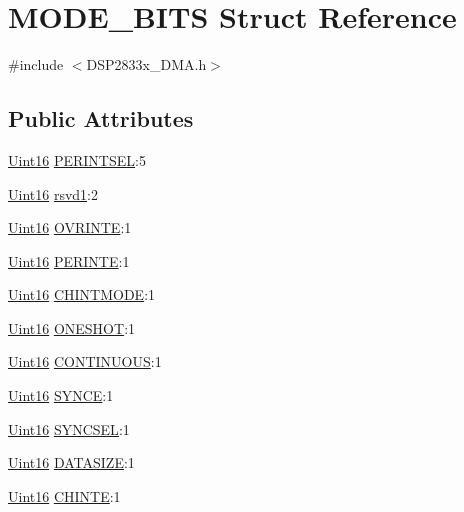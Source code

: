 \hypertarget{struct_m_o_d_e___b_i_t_s}{}\section{M\+O\+D\+E\+\_\+\+B\+I\+T\+S Struct Reference}
\label{struct_m_o_d_e___b_i_t_s}


{\ttfamily \#include $<$D\+S\+P2833x\+\_\+\+D\+M\+A.\+h$>$}

\subsection*{Public Attributes}
\begin{DoxyCompactItemize}
\item 
\hyperlink{_d_s_p2833x___device_8h_a59a9f6be4562c327cbfb4f7e8e18f08b}{Uint16} \hyperlink{struct_m_o_d_e___b_i_t_s_a2a5d251ddb86a48bb831bc33497c3378}{P\+E\+R\+I\+N\+T\+S\+E\+L}\+:5
\item 
\hyperlink{_d_s_p2833x___device_8h_a59a9f6be4562c327cbfb4f7e8e18f08b}{Uint16} \hyperlink{struct_m_o_d_e___b_i_t_s_a91928458ccf564bdc6a272a73e8776b9}{rsvd1}\+:2
\item 
\hyperlink{_d_s_p2833x___device_8h_a59a9f6be4562c327cbfb4f7e8e18f08b}{Uint16} \hyperlink{struct_m_o_d_e___b_i_t_s_a81d3846d28438e68b6af7324d4cceeec}{O\+V\+R\+I\+N\+T\+E}\+:1
\item 
\hyperlink{_d_s_p2833x___device_8h_a59a9f6be4562c327cbfb4f7e8e18f08b}{Uint16} \hyperlink{struct_m_o_d_e___b_i_t_s_a1e1aa05a37e3ebffbea926fb08af1f98}{P\+E\+R\+I\+N\+T\+E}\+:1
\item 
\hyperlink{_d_s_p2833x___device_8h_a59a9f6be4562c327cbfb4f7e8e18f08b}{Uint16} \hyperlink{struct_m_o_d_e___b_i_t_s_a9d092ae26275958355923efdc23a7b1b}{C\+H\+I\+N\+T\+M\+O\+D\+E}\+:1
\item 
\hyperlink{_d_s_p2833x___device_8h_a59a9f6be4562c327cbfb4f7e8e18f08b}{Uint16} \hyperlink{struct_m_o_d_e___b_i_t_s_a4ede975f0197ce44ead23987dca03f00}{O\+N\+E\+S\+H\+O\+T}\+:1
\item 
\hyperlink{_d_s_p2833x___device_8h_a59a9f6be4562c327cbfb4f7e8e18f08b}{Uint16} \hyperlink{struct_m_o_d_e___b_i_t_s_ac9ff3bc05bd18847d98014a5281d400d}{C\+O\+N\+T\+I\+N\+U\+O\+U\+S}\+:1
\item 
\hyperlink{_d_s_p2833x___device_8h_a59a9f6be4562c327cbfb4f7e8e18f08b}{Uint16} \hyperlink{struct_m_o_d_e___b_i_t_s_a4ea2b332f7de983c1c5d1fcad04b0156}{S\+Y\+N\+C\+E}\+:1
\item 
\hyperlink{_d_s_p2833x___device_8h_a59a9f6be4562c327cbfb4f7e8e18f08b}{Uint16} \hyperlink{struct_m_o_d_e___b_i_t_s_aea6c50775d74b845ce6d1dd3d1f74d1c}{S\+Y\+N\+C\+S\+E\+L}\+:1
\item 
\hyperlink{_d_s_p2833x___device_8h_a59a9f6be4562c327cbfb4f7e8e18f08b}{Uint16} \hyperlink{struct_m_o_d_e___b_i_t_s_aea13d0e14e93af9c058ff71252b03738}{D\+A\+T\+A\+S\+I\+Z\+E}\+:1
\item 
\hyperlink{_d_s_p2833x___device_8h_a59a9f6be4562c327cbfb4f7e8e18f08b}{Uint16} \hyperlink{struct_m_o_d_e___b_i_t_s_a6460336e464259594203d8cab94e3857}{C\+H\+I\+N\+T\+E}\+:1
\end{DoxyCompactItemize}


